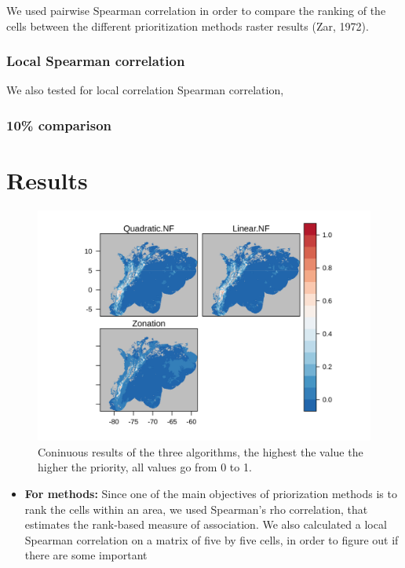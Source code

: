 \documentclass[]{article}
\providecommand{\tightlist}{%
  \setlength{\itemsep}{0pt}\setlength{\parskip}{0pt}}
\begin{document}
We used pairwise Spearman correlation in order to compare the ranking of the cells between the different prioritization methods raster results (Zar, 1972).

\hypertarget{local-spearman-correlation}{%
\subsubsection{Local Spearman correlation}\label{local-spearman-correlation}}

We also tested for local correlation Spearman correlation,

\hypertarget{comparison}{%
\subsubsection{10\% comparison}\label{comparison}}

\hypertarget{results}{%
\section*{Results}\label{results}}

\begin{figure}
\centering
\includegraphics{NFPaper_files/figure-latex/AllSols-1.png}
\caption{\label{fig:AllSols}Coninuous results of the three algorithms, the highest the value the higher the priority, all values go from 0 to 1.}
\end{figure}

\begin{itemize}
\tightlist
\item
  \textbf{For methods:} Since one of the main objectives of priorization methods is to rank the cells within an area, we used Spearman's rho correlation, that estimates the rank-based measure of association. We also calculated a local Spearman correlation on a matrix of five by five cells, in order to figure out if there are some important
\end{itemize}
\end{document}
